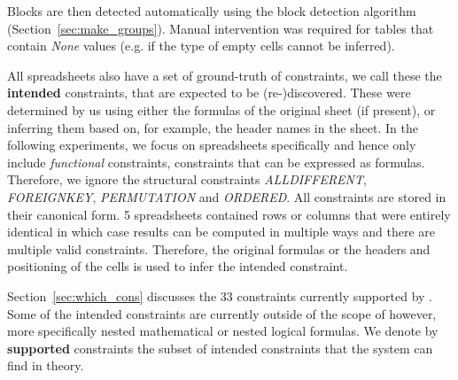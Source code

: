 Blocks are then detected automatically using the block detection algorithm (Section~\ref{sec:make_groups}).
Manual intervention was required for tables that contain \textit{None} values (e.g. if the type of empty cells cannot be inferred).


All spreadsheets also have a set of ground-truth of constraints, we call these the \textbf{intended} constraints, that are expected to be (re-)discovered.
These were determined by us using either the formulas of the original sheet (if present), or inferring them based on, for example, the header names in the sheet.
In the following experiments, we focus on spreadsheets specifically and hence only include \textit{functional} constraints, constraints that can be expressed as formulas.
Therefore, we ignore the structural constraints \textit{ALLDIFFERENT}, \textit{FOREIGNKEY}, \textit{PERMUTATION} and \textit{ORDERED}.
All constraints are stored in their canonical form.
5 spreadsheets contained rows or columns that were entirely identical in which case results can be computed in multiple ways and there are multiple valid constraints.
Therefore, the original formulas or the headers and positioning of the cells is used to infer the intended constraint.

Section~\ref{sec:which_cons} discusses the 33 constraints currently supported by \sname. Some of the intended constraints are currently outside of the scope of \sname however, more specifically nested mathematical or nested logical formulas. We denote by \textbf{supported} constraints the subset of intended constraints that the system can find in theory.

